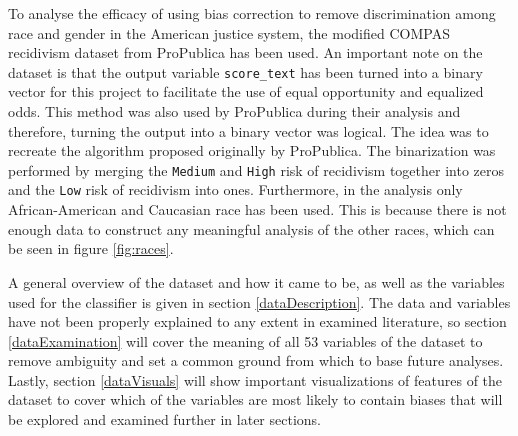 \documentclass[11pt, fleqn, titlepage]{article}
\begin{document}
	\noindent To analyse the efficacy of using bias correction to remove discrimination among race and gender in the American justice system, the modified COMPAS recidivism dataset from ProPublica has been used. An important note on the dataset is that the output variable \texttt{score\_text} has been turned into a binary vector for this project to facilitate the use of equal opportunity and equalized odds. This method was also used by ProPublica during their analysis and therefore, turning the output into a binary vector was logical. The idea was to recreate the algorithm proposed originally by ProPublica. The binarization was performed by merging the \texttt{Medium} and \texttt{High} risk of recidivism together into zeros and the \texttt{Low} risk of recidivism into ones. Furthermore, in the analysis only African-American and Caucasian race has been used. This is because there is not enough data to construct any meaningful analysis of the other races, which can be seen in figure \ref{fig:races}.
	
	A general overview of the dataset and how it came to be, as well as the variables used for the classifier is given in section \ref{dataDescription}. The data and variables have not been properly explained to any extent in examined literature, so section \ref{dataExamination} will cover the meaning of all 53 variables of the dataset to remove ambiguity and set a common ground from which to base future analyses. Lastly, section \ref{dataVisuals} will show important visualizations of features of the dataset to cover which of the variables are most likely to contain biases that will be explored and examined further in later sections.
	
\end{document}
